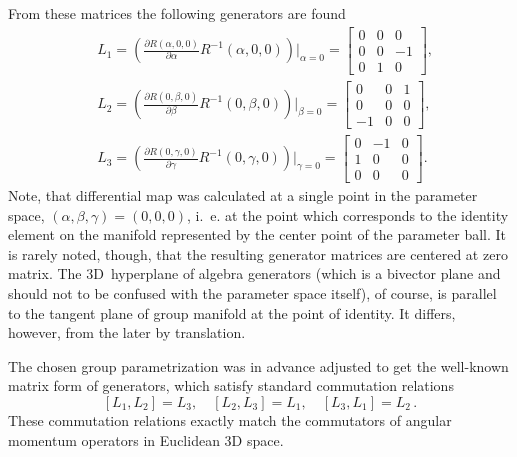 \begin{example}
From these matrices the following generators are found
\[
\begin{split}
& L_1= \left(\frac{\partial R(\alpha,
0,0)}{\partial\alpha}R^{-1}(\alpha, 0,0)\right)\Big\rvert_{\alpha
=0} = \begin{bmatrix}
0&0&0\\
0&0&-1\\
0&1&0
\end{bmatrix},\\
& L_2=\left(\frac{\partial
R(0,\beta,0)}{\partial\beta}R^{-1}(0,\beta,0)\right)\Big\rvert_{\beta
=0} = \begin{bmatrix}
0&0&1\\
0&0&0\\
-1&0&0
\end{bmatrix},\\
& L_3=\left(\frac{\partial
R(0,\gamma,0)}{\partial\gamma}R^{-1}(0,\gamma,0)\right)\Big\rvert_{\gamma
=0}= \begin{bmatrix}
0&-1&0\\
1&0&0\\
0&0&0
\end{bmatrix}.
\end{split}
\]
Note, that differential map was calculated at a single point in
the parameter space, $(\alpha,\beta,\gamma)=(0,0,0)$, i.~e. at the
point which corresponds to the identity element on the manifold
represented by the center point of the parameter ball. It is rarely
noted, though, that the resulting generator matrices are centered
at zero matrix. The 3D~hyperplane of algebra generators (which is
a bivector plane and should not to be confused with the parameter
space itself), of course, is parallel to the tangent plane of
group manifold at the point of identity. It differs, however, from
the later by translation.

The chosen group parametrization was in advance adjusted to get
the well-known matrix form of generators, which satisfy standard
commutation relations
\[
[L_1,L_2]=L_3,\quad[L_2,L_3]=L_1,\quad[L_3,L_1]=L_2\, .
\]
These commutation relations exactly match the commutators of
angular momentum operators in Euclidean 3D space.
\end{example}

